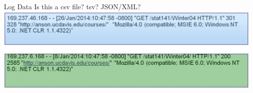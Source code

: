 \documentclass[aspectratio=169]{../latex_main/tntbeamer}  %
\begin{document}
	
	
	
	\begin{frame}{Log Data}
	               Is this a csv file? tsv? JSON/XML?\\
                                                                       
	           \includegraphics[scale=.4]{Bild13}                               
	\end{frame}
\end{document}

